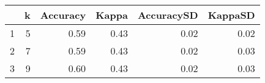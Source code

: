 \begin{table}[ht]
\begin{center}
{\tiny
\begin{tabular}{rrrrrr}
  \hline
 & k & Accuracy & Kappa & AccuracySD & KappaSD \\ 
  \hline
1 &   5 & 0.59 & 0.43 & 0.02 & 0.02 \\ 
  2 &   7 & 0.59 & 0.43 & 0.02 & 0.03 \\ 
  3 &   9 & 0.60 & 0.43 & 0.02 & 0.03 \\ 
   \hline
\end{tabular}
}
\end{center}
\end{table}
